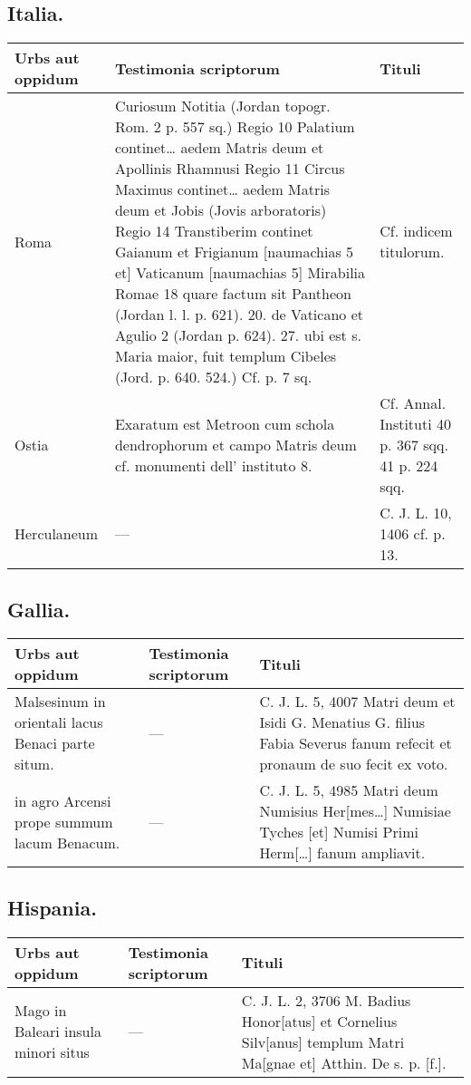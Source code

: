 \documentclass[a4paper, 11pt, oneside, polutonikogreek, german]{article}
\begin{document}
\subsection{Italia.}
\begin{table}[H]
    \Fontauri
    \footnotesize
    \centering
    \begin{tabular}{|p{30mm}|p{40mm}|p{40mm}|}
    \hline
        Urbs aut oppidum & Testimonia scriptorum & Tituli \\ \hline
        Roma & Curiosum Notitia (Jordan topogr. Rom. 2 p. 557 sq.) Regio 10 Palatium continet… aedem Matris deum et Apollinis Rhamnusi Regio 11 Circus Maximus continet… aedem Matris deum et Jobis (Jovis arboratoris) Regio 14 Transtiberim continet Gaianum et Frigianum [naumachias 5 et] Vaticanum [naumachias 5] Mirabilia Romae 18 quare factum sit Pantheon (Jordan l. l. p. 621). 20. de Vaticano et Agulio 2 (Jordan p. 624). 27. ubi est s. Maria maior, fuit templum Cibeles (Jord. p. 640. 524.) Cf. p. 7 sq. & Cf. indicem titulorum. \\ \hline
        Ostia & Exaratum est Metroon cum schola dendrophorum et campo Matris deum cf. monumenti dell’ instituto 8. & Cf. Annal. Instituti 40 p. 367 sqq. 41 p. 224 sqq. \\ \hline
        Herculaneum & --- & C. J. L. 10, 1406 cf. p. 13. \\ \hline
    \end{tabular}
\end{table}
\subsection{Gallia.}
\begin{table}[H]
    \Fontauri
    \footnotesize
    \centering
    \begin{tabular}{|p{30mm}|p{20mm}|p{60mm}|}
    \hline
        Urbs aut oppidum & Testimonia scriptorum & Tituli \\ \hline
        Malsesinum in orientali lacus Benaci parte situm. & --- & C. J. L. 5, 4007 Matri deum et Isidi G. Menatius G. filius Fabia Severus fanum refecit et pronaum de suo fecit ex voto. \\ \hline
        in agro Arcensi prope summum lacum Benacum. & --- & C. J. L. 5, 4985 Matri deum Numisius Her[mes…] Numisiae Tyches [et] Numisi Primi Herm[…] fanum ampliavit. \\ \hline
    \end{tabular}
\end{table}
\subsection{Hispania.}
\begin{table}[H]
    \Fontauri
    \footnotesize
    \centering
    \begin{tabular}{|p{30mm}|p{20mm}|p{60mm}|}
    \hline
        Urbs aut oppidum & Testimonia scriptorum & Tituli \\ \hline
        Mago in Baleari insula minori situs & --- & C. J. L. 2, 3706 M. Badius Honor[atus] et Cornelius Silv[anus] templum Matri Ma[gnae et] Atthin. De s. p. [f.]. \\ \hline
    \end{tabular}
\end{table}
\end{document}
